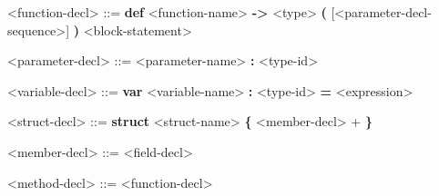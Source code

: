 \begin{mdframed}
\begin{grammar}
<function-decl> ::=
\textbf{def} <function-name> \textbf{-\textgreater} <type> 
\textbf{(} [<parameter-decl-sequence>] \textbf{)} <block-statement>

<parameter-decl> ::=
<parameter-name> \textbf{:} <type-id>

<variable-decl> ::=
\textbf{var} <variable-name> \textbf{:} <type-id> \textbf{=} <expression>

<struct-decl> ::=
\textbf{struct} <struct-name>
\textbf{\{}
	<member-decl> +
\textbf{\}}

<member-decl> ::=
<field-decl>

<method-decl> ::= <function-decl>


\end{grammar}
\end{mdframed}


